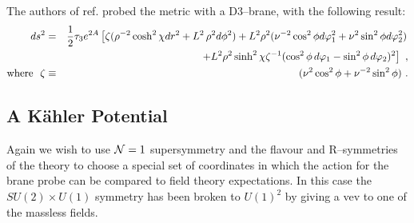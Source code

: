 \documentclass[a4paper,12pt]{article}
\newcommand{\labell}[1]{\label{#1}}
\begin{document}
%
The authors of ref.\cite{warnernew}  probed the
metric with a D3--brane, with the following result:
\begin{eqnarray}
ds^2 &=& {1 \over 2} \tau_3 e^{2A} 
\left[ \zeta  (  \rho^{-2} \cosh^2\chi  dr^2
+ L^2\, \rho^2  d \phi^2 ) %
+   L^2 \rho^2 (\nu^{-2} \cos^2 \phi 
d\varphi_1^2 
+ \nu^2 \sin^2 \phi  d\varphi_2^2)\right.\nonumber \\ 
& & \left. \qquad\qquad\qquad\qquad\qquad+  L^2 \rho^2  
\sinh^2\chi \zeta^{-1} (  \cos^2\phi \, d\varphi_1  - 
 \sin^2\phi  \,d\varphi_2 )^2  \right]  \ , \nonumber\\
\mbox{where}\,\,\,\, \zeta &\equiv&(\nu^2 \cos^2 \phi + 
\nu^{-2} \sin^2 \phi )\ .
 \labell{newmoduli}
\end{eqnarray}


\subsection{A K\"ahler Potential}

Again we wish to use ${\cal N}=1$ supersymmetry and the flavour and
R--symmetries of the theory to choose a special set of coordinates in
which the action for the brane probe can be compared to field theory
expectations. In this case the $SU(2){\times}U(1)$ symmetry has been
broken to $U(1)^2$ by giving a vev to one of the massless fields. 
\end{document}
